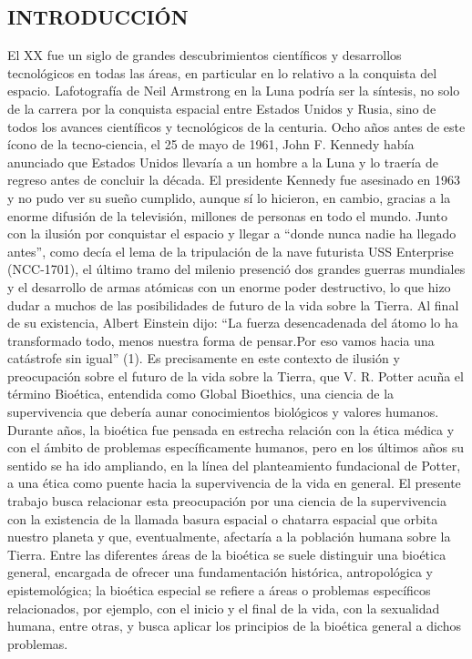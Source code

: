 \documentclass[12pt,letterpaper]{article}
\begin{document}
\begin{multicols}{2}
\section*{ \small {  INTRODUCCIÓN}}

\noindent El XX fue un siglo de grandes descubrimientos científicos y desarrollos tecnológicos en todas las áreas, en particular en lo relativo a la conquista del espacio. Lafotografía de Neil Armstrong en la Luna podría ser la síntesis, no solo de la carrera por la conquista espacial entre Estados Unidos y Rusia, sino de todos los avances científicos y tecnológicos de la centuria. Ocho años antes de este ícono de la tecno-ciencia, el 25 de mayo de 1961, John F. Kennedy había anunciado que Estados Unidos llevaría a un hombre a la Luna y lo traería de regreso antes de concluir la década. El presidente Kennedy fue asesinado en 1963 y no pudo ver su sueño cumplido, aunque sí lo hicieron, en cambio, gracias a la enorme difusión de la televisión, millones de personas en todo el mundo. Junto con la ilusión por conquistar el espacio y llegar a “donde nunca nadie ha llegado antes”, como decía el lema de la tripulación de la nave futurista USS Enterprise (NCC-1701), el último tramo del milenio presenció dos grandes guerras mundiales y el desarrollo de armas atómicas con un enorme poder destructivo, lo que hizo dudar a muchos de las posibilidades de futuro de la vida sobre la Tierra. Al final de su existencia, Albert Einstein dijo: “La fuerza desencadenada del átomo lo ha transformado todo, menos nuestra forma de pensar.Por eso vamos hacia una catástrofe sin igual” (1). Es precisamente en este contexto de ilusión y preocupación sobre el futuro de la vida sobre la Tierra, que V. R. Potter acuña el término Bioética, entendida como Global Bioethics, una ciencia de la supervivencia que debería aunar conocimientos biológicos y valores humanos.
Durante años, la bioética fue pensada en estrecha relación con la ética médica y con el ámbito de problemas específicamente humanos, pero en los últimos años su sentido se ha ido ampliando, en la línea del planteamiento fundacional de Potter, a una ética como puente hacia la supervivencia de la vida en general. El presente trabajo busca relacionar esta preocupación por una ciencia de la supervivencia con la existencia de la llamada basura espacial o chatarra espacial que orbita nuestro planeta y que, eventualmente, afectaría a la población humana sobre la Tierra. Entre las diferentes áreas de la bioética se suele distinguir una bioética general, encargada de ofrecer una fundamentación histórica, antropológica y epistemológica; la bioética especial se refiere a áreas o problemas específicos relacionados, por ejemplo, con el inicio y el final de la vida, con la sexualidad humana, entre otras, y busca aplicar los principios de la bioética general a dichos problemas.



\end{multicols}
\end{document}
